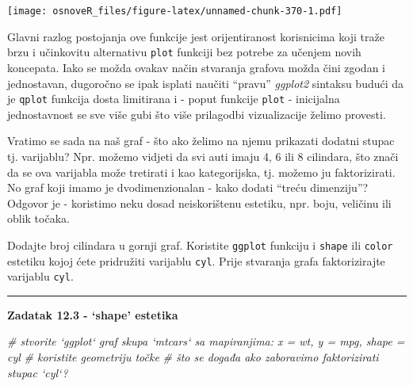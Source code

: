 \documentclass[]{book}
\newenvironment{Shaded}{\begin{snugshade}}{\end{snugshade}}
\newcommand{\KeywordTok}[1]{\textcolor[rgb]{0.13,0.29,0.53}{\textbf{#1}}}
\newcommand{\DataTypeTok}[1]{\textcolor[rgb]{0.13,0.29,0.53}{#1}}
\newcommand{\StringTok}[1]{\textcolor[rgb]{0.31,0.60,0.02}{#1}}
\newcommand{\CommentTok}[1]{\textcolor[rgb]{0.56,0.35,0.01}{\textit{#1}}}
\newcommand{\OperatorTok}[1]{\textcolor[rgb]{0.81,0.36,0.00}{\textbf{#1}}}
\newcommand{\NormalTok}[1]{#1}
\theoremstyle{definition}
\theoremstyle{definition}
\theoremstyle{definition}
\theoremstyle{remark}
\begin{document}
\texttt{[image: osnoveR\_files/figure-latex/unnamed-chunk-370-1.pdf]}

Glavni razlog postojanja ove funkcije jest orijentiranost korisnicima
koji traže brzu i učinkovitu alternativu \texttt{plot} funkciji bez
potrebe za učenjem novih koncepata. Iako se možda ovakav način stvaranja
grafova možda čini zgodan i jednostavan, dugoročno se ipak isplati
naučiti ``pravu'' \emph{ggplot2} sintaksu budući da je \texttt{qplot}
funkcija dosta limitirana i - poput funkcije \texttt{plot} - inicijalna
jednostavnost se sve više gubi što više prilagodbi vizualizacije želimo
provesti.

Vratimo se sada na naš graf - što ako želimo na njemu prikazati dodatni
stupac tj. varijablu? Npr. možemo vidjeti da svi auti imaju 4, 6 ili 8
cilindara, što znači da se ova varijabla može tretirati i kao
kategorijska, tj. možemo ju faktorizirati. No graf koji imamo je
dvodimenzionalan - kako dodati ``treću dimenziju''? Odgovor je -
koristimo neku dosad neiskorištenu estetiku, npr. boju, veličinu ili
oblik točaka.

Dodajte broj cilindara u gornji graf. Koristite \texttt{ggplot} funkciju
i \texttt{shape} ili \texttt{color} estetiku kojoj ćete pridružiti
varijablu \texttt{cyl}. Prije stvaranja grafa faktorizirajte varijablu
\texttt{cyl}.

\begin{center}\rule{0.5\linewidth}{\linethickness}\end{center}

\textbf{Zadatak 12.3 - `shape' estetika}

\begin{Shaded}
\begin{Highlighting}[]
\CommentTok{# stvorite `ggplot` graf skupa `mtcars` sa mapiranjima:  x = wt, y = mpg, shape = cyl}
\CommentTok{# koristite geometriju točke}
\CommentTok{# što se događa ako zaboravimo faktorizirati stupac `cyl`?}
\end{Highlighting}
\end{Shaded}

\begin{Shaded}
\end{Shaded}
\end{document}
